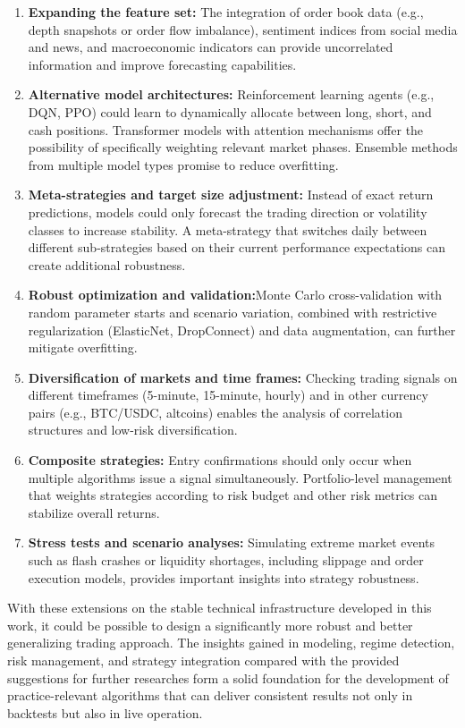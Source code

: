 \begin{enumerate}
    \item \textbf{Expanding the feature set:} The integration of order book data (e.g., depth snapshots or order flow imbalance), sentiment indices from social media and news, and macroeconomic indicators can provide uncorrelated information and improve forecasting capabilities.
    \item \textbf{Alternative model architectures:} Reinforcement learning agents (e.g., DQN, PPO) could learn to dynamically allocate between long, short, and cash positions. Transformer models with attention mechanisms offer the possibility of specifically weighting relevant market phases. Ensemble methods from multiple model types promise to reduce overfitting.
    \item \textbf{Meta-strategies and target size adjustment:} Instead of exact return predictions, models could only forecast the trading direction or volatility classes to increase stability. A meta-strategy that switches daily between different sub-strategies based on their current performance expectations can create additional robustness.
    \item \textbf{Robust optimization and validation:}Monte Carlo cross-validation with random parameter starts and scenario variation, combined with restrictive regularization (ElasticNet, DropConnect) and data augmentation, can further mitigate overfitting.
    \item \textbf{Diversification of markets and time frames:} Checking trading signals on different timeframes (5-minute, 15-minute, hourly) and in other currency pairs (e.g., BTC/USDC, altcoins) enables the analysis of correlation structures and low-risk diversification.
    \item \textbf{Composite strategies:} Entry confirmations should only occur when multiple algorithms issue a signal simultaneously. Portfolio-level management that weights strategies according to risk budget and other risk metrics can stabilize overall returns.
    \item \textbf{Stress tests and scenario analyses:} Simulating extreme market events such as flash crashes or liquidity shortages, including slippage and order execution models, provides important insights into strategy robustness.
\end{enumerate}

\noindent
With these extensions on the stable technical infrastructure developed in this work, it could be possible to design a significantly more robust and better generalizing trading approach.
The insights gained in modeling, regime detection, risk management, and strategy integration compared with the provided suggestions for further researches form a solid foundation for the development of practice-relevant algorithms that can deliver consistent results not only in backtests but also in live operation.

